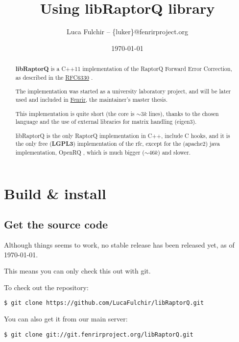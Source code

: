 \documentclass[11pt,a4paper]{refart}
\title{Using libRaptorQ library}
\author{Luca Fulchir -- \{luker\}@fenrirproject.org}
\date{\today}
\begin{document}
\maketitle

\begin{abstract}

\textbf{libRaptorQ} is a C++11 implementation of the RaptorQ Forward Error Correction, as described in the \href{https://tools.ietf.org/html/rfc6330}{RFC6330} .

The implementation was started as a university laboratory project, and will be later used and included in \href{https://www.fenrirproject.org}{Fenrir}, the maintainer's master thesis.

This implementation is quite short (the core is $\sim3k$ lines), thanks to the chosen language and the use of external libraries for matrix handling (eigen3).

libRaptorQ is the only RaptorQ implementation in C++, include C hooks, and it is the only free (\textbf{LGPL3}) implementation of the rfc, except for the (apache2) java implementation, OpenRQ , which is much bigger ($\sim 46k$) and slower.
\end{abstract}

\tableofcontents
\newpage

\section{Build \& install}
\subsection{Get the source code}
Although things seems to work, no stable release has been released yet, as of \today.

This means you can only check this out with git.

To check out the repository:

\begin{verbatim}
$ git clone https://github.com/LucaFulchir/libRaptorQ.git
\end{verbatim}

You can also get it from our main server:

\begin{verbatim}
$ git clone git://git.fenrirproject.org/libRaptorQ.git
\end{verbatim}
\end{document}
